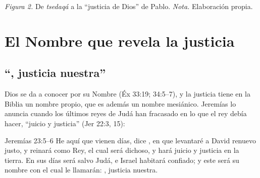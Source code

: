 \begin{center}
\par
{\footnotesize\color{gris}\textit{Figura 2.} De \emph{tsedaqá} a la ``justicia de Dios'' de Pablo. \textit{Nota.} Elaboración propia.}
\end{center}

\section{El Nombre que revela la justicia}

\subsection{“\SENOR, justicia nuestra”}
Dios se da a conocer por su Nombre (Éx 33:19; 34:5--7), y la justicia tiene en la Biblia un nombre propio, que es además un nombre mesiánico. Jeremías lo anuncia cuando los últimos reyes de Judá han fracasado en lo que el rey debía hacer, ``juicio y justicia'' (Jer 22:3, 15):

\begin{verso}{Jeremías 23:5–6}
He aquí que vienen días, dice \SENOR, en que levantaré a David renuevo justo, y reinará como Rey, el cual será dichoso, y hará juicio y justicia en la tierra. En sus días será salvo Judá, e Israel habitará confiado; y este será su nombre con el cual le llamarán: \SENOR, justicia nuestra.
\end{verso}

